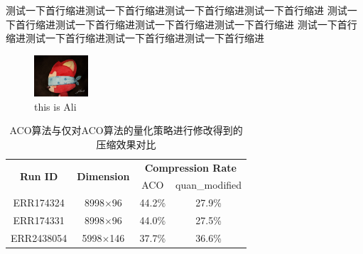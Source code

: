 \documentclass{article}
\begin{document}
	测试一下首行缩进测试一下首行缩进测试一下首行缩进测试一下首行缩进
	测试一下首行缩进测试一下首行缩进测试一下首行缩进测试一下首行缩进
	测试一下首行缩进测试一下首行缩进测试一下首行缩进测试一下首行缩进

	\begin{figure}[hbt]
		\centering
		\includegraphics[width=2cm]{Ali.jpg}
		\caption{this is Ali}
	\end{figure}

	\begin{table}[htbp]
		\centering
		\caption{ACO算法与仅对ACO算法的量化策略进行修改得到的压缩效果对比}
		\begin{tabular}{cccc}
		\cline{1-4} %
		\multirow{2}{*}{\textbf{Run ID}} & \multirow{2}{*}{\textbf{Dimension}}     & \multicolumn{2}{c}{\textbf{Compression Rate}} \\
						  &                       &   ACO        &   quan\_modified       \\ \cline{1-4}
			 ERR174324             & \multicolumn{1}{c|}{8998$\times$96} &   44.2\%        &    27.9\%      \\
			   ERR174331           & \multicolumn{1}{c|}{8998$\times$96} &    44.0\%       &   27.5\%       \\
			   ERR2438054          & \multicolumn{1}{c|}{5998$\times$146} &     37.7\%      &   36.6\%       \\ \cline{1-4}
		\end{tabular}
	\end{table}
\end{document}
